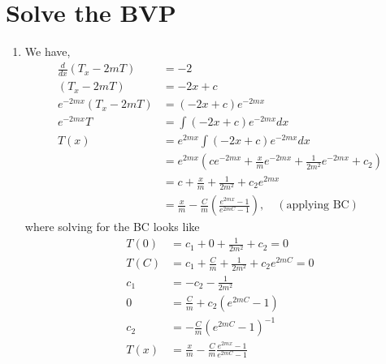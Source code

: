\documentclass{article}
\begin{document}
\section{Solve the BVP}
    \begin{enumerate}[label=\roman*)]
        \item We have, 
        \begin{align*}
            \frac{d}{dx}\left(T_x - 2mT\right) &= -2
            \\
            \left(T_x - 2mT\right) &= -2x + c
            \\
            e^{-2mx}\left(T_x - 2mT\right) &= (-2x + c)e^{-2mx}
            \\
            e^{-2mx}T &= \int (-2x+c)e^{-2mx}dx
            \\
            T(x) &= e^{2mx}\int (-2x+c)e^{-2mx}dx
            \\
            &= e^{2mx}\left(ce^{-2mx} + \frac{x}{m}e^{-2mx} +
            \frac{1}{2m^2}e^{-2mx} + c_2\right)
            \\
            &= c + \frac{x}{m} + \frac{1}{2m^2} + c_2e^{2mx}
            \\
            &= \frac{x}{m} - \frac{C}{m}\left(\frac{e^{2mx} - 1}{e^{2mC} -
            1}\right), \quad (\text{applying BC})
        \end{align*}
        where solving for the BC looks like
        \begin{align*}
            T(0) &= c_1 + 0 + \frac{1}{2m^2} + c_2 = 0\\
            T(C) &= c_1 + \frac{C}{m} + \frac{1}{2m^2} + c_2e^{2mC} = 0\\
            c_1 &= -c_2 - \frac{1}{2m^2}
            \\
            0 &= \frac{C}{m} + c_2\left(e^{2mC} - 1\right)
            \\
            c_2 &= -\frac{C}{m}\left(e^{2mC} - 1\right)^{-1}
            \\
            T(x) &= \frac{x}{m} - \frac{C}{m}\frac{e^{2mx} - 1}{e^{2mC} - 1}
        \end{align*}
    \end{enumerate}
\end{document}
